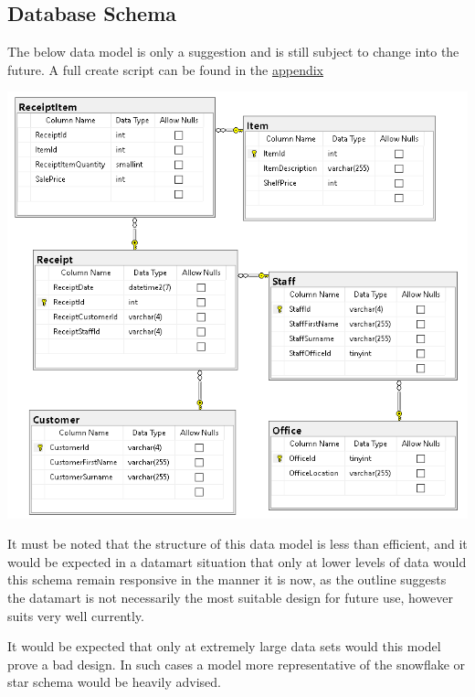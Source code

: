 \documentclass{article}
\begin{document}
        \subsection{Database Schema}
            The below data model is only a suggestion and is still subject to change into the future. A full create script can be found in the \hyperref[sec:Appendix]{\color{blue}appendix}
                \begin{center}
                    \includegraphics[width=\textwidth,keepaspectratio]{Images/schema.PNG}
                \end{center}
            It must be noted that the structure of this data model is 
            less than efficient, and it would be expected in a datamart
            situation that only at lower levels of data would this schema
            remain responsive in the manner it is now, as the outline
            suggests the datamart is not necessarily the most suitable
            design for future use, however suits very well currently.
            \par
            It would be expected that only at extremely large data sets
            would this model prove a bad design. In such cases a model 
            more representative of the snowflake or star schema would be
            heavily advised.

\newpage
\end{document}
